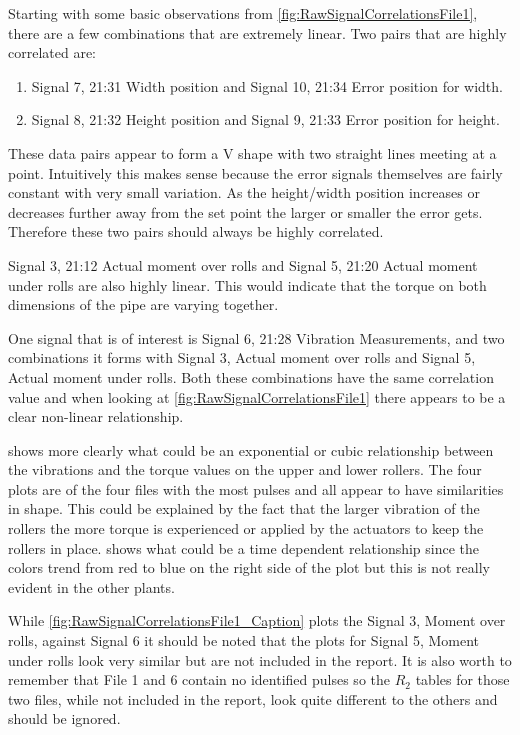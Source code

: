 \documentclass[]{article}
\begin{document}
Starting with some basic observations from \cref{fig:RawSignalCorrelationsFile1}, there are a few combinations that are extremely linear. Two pairs that are highly correlated are:
\begin{enumerate}
\item Signal 7, 21:31 Width position and Signal 10, 21:34 Error position for width.
\item Signal 8, 21:32 Height position and Signal 9, 21:33 Error position for height.
\end{enumerate}
These data pairs appear to form a V shape with two straight lines meeting at a point. Intuitively this makes sense because the error signals themselves are fairly constant with very small variation. As the height/width position increases or decreases further away from the set point the larger or smaller the error gets. Therefore these two pairs should always be highly correlated.  

Signal 3, 21:12 Actual moment over rolls and Signal 5, 21:20 Actual moment under rolls are also highly linear. This would indicate that the torque on both dimensions of the pipe are varying together.

One signal that is of interest is Signal 6, 21:28 Vibration Measurements, and two combinations it forms with Signal 3, Actual moment over rolls and Signal 5, Actual moment under rolls. Both these combinations have the same correlation value and when looking at \cref{fig:RawSignalCorrelationsFile1} there appears to be a clear non-linear relationship.

 shows more clearly what could be an exponential or cubic relationship between the vibrations and the torque values on the upper and lower rollers. The four plots are of the four files with the most pulses and all appear to have similarities in shape. This could be explained by the fact that the larger vibration of the rollers the more torque is experienced or applied by the actuators to keep the rollers in place.  shows what could be a time dependent relationship since the colors trend from red to blue on the right side of the plot but this is not really evident in the other plants. 

While \cref{fig:RawSignalCorrelationsFile1_Caption} plots the Signal 3, Moment over rolls, against Signal 6 it should be noted that the plots for Signal 5, Moment under rolls look very similar but are not included in the report. It is also worth to remember that File 1 and 6 contain no identified pulses so the $R_2$ tables for those two files, while not included in the report, look quite different to the others and should be ignored.
\end{document}
